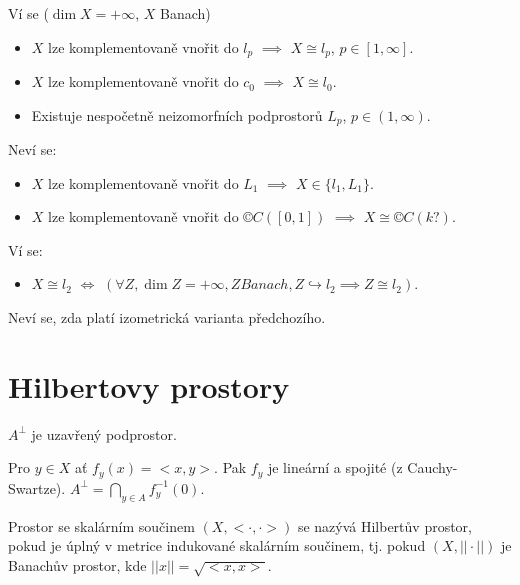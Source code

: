 \documentclass[12pt]{article}					%
\begin{document}
\begin{poznamka}
	Ví se ($\dim X = +∞$, $X$ Banach)

	\begin{itemize}
		\item $X$ lze komplementovaně vnořit do $l_p$ $\implies$ $X \cong l_p$, $p \in [1, ∞]$.
		\item $X$ lze komplementovaně vnořit do $c_0$ $\implies$ $X \cong l_0$.
		\item Existuje nespočetně neizomorfních podprostorů $L_p$, $p \in (1, ∞)$.
	\end{itemize}

	Neví se:

	\begin{itemize}
		\item $X$ lze komplementovaně vnořit do $L_1$ $\implies$ $X \in \{l_1, L_1\}$.
		\item $X$ lze komplementovaně vnořit do $©C([0, 1])$ $\implies$ $X \cong ©C(k?)$.
	\end{itemize}

	Ví se:

	\begin{itemize}
		\item $X \cong l_2$ $\Leftrightarrow$ $(\forall Z, \dim Z = +∞, Z Banach, Z \hookrightarrow l_2 \implies Z \cong l_2)$.
	\end{itemize}

	Neví se, zda platí izometrická varianta předchozího.
\end{poznamka}

\section{Hilbertovy prostory}
\begin{lemma}
	$A^{\perp}$ je uzavřený podprostor.

	\begin{dukazin}
		Pro $y \in X$ ať $f_y(x) = <x, y>$. Pak $f_y$ je lineární a spojité (z Cauchy-Swartze). $A^{\perp} = \bigcap_{y \in A}f^{-1}_y(0)$.
	\end{dukazin}
\end{lemma}

\begin{definice}
	Prostor se skalárním součinem $(X, <·, ·>)$ se nazývá Hilbertův prostor, pokud je úplný v metrice indukované skalárním součinem, tj. pokud $(X, ||·||)$ je Banachův prostor, kde $||x|| = \sqrt{<x, x>}$.
\end{definice}
\end{document}
